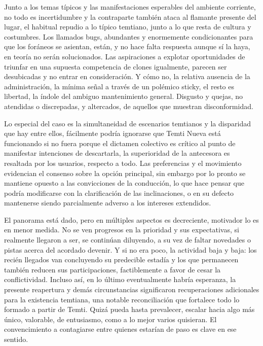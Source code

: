 \documentclass[
]{book}
\begin{document}
Junto a los temas típicos y las manifestaciones esperables del ambiente corriente, no todo es incertidumbre y la contraparte también ataca al flamante presente del lugar, el habitual repudio a lo típico temtiano, junto a lo que resta de cultura y costumbres. Los llamados bugs, abundantes y enormemente condicionantes para que los foráneos se asientan, están, y no hace falta respuesta aunque sí la haya, en teoría no serán solucionados. Las aspiraciones a explotar oportunidades de triunfar en una supuesta competencia de clones igualmente, parecen ser desubicadas y no entrar en consideración. Y cómo no, la relativa ausencia de la administración, la mínima señal a través de un polémico sticky, el resto es libertad, la índole del ambiguo mantenimiento general. Disgusto y quejas, no atendidas o discrepadas, y altercados, de aquellos que muestran disconformidad.

Lo especial del caso es la simultaneidad de escenarios temtianos y la disparidad que hay entre ellos, fácilmente podría ignorarse que Temti Nueva está funcionando si no fuera porque el dictamen colectivo es crítico al punto de manifestar intenciones de descartarla, la superioridad de la antecesora es resaltada por los usuarios, respecto a todo. Las preferencias y el movimiento evidencian el consenso sobre la opción principal, sin embargo por lo pronto se mantiene opuesto a las convicciones de la conducción, lo que hace pensar que podría modificarse con la clarificación de las inclinaciones, o en su defecto mantenerse siendo parcialmente adverso a los intereses extendidos.

El panorama está dado, pero en múltiples aspectos es decreciente, motivador lo es en menor medida. No se ven progresos en la prioridad y sus expectativas, si realmente llegaron a ser, se continúan diluyendo, a su vez de faltar novedades o pistas acerca del acordado devenir. Y si no era poco, la actividad baja y baja: los recién llegados van concluyendo su predecible estadía y los que permanecen también reducen sus participaciones, factiblemente a favor de cesar la conflictividad. Incluso así, en lo último eventualmente habría esperanza, la presente reapertura y demás circunstancias significaron recuperaciones adicionales para la existencia temtiana, una notable reconciliación que fortalece todo lo formado a partir de Temti. Quizá pueda hasta prevalecer, escalar hacia algo más único, valorable, de entusiasmo, como a lo mejor varios quisieran. El convencimiento a contagiarse entre quienes estarían de paso es clave en ese sentido.
\end{document}
